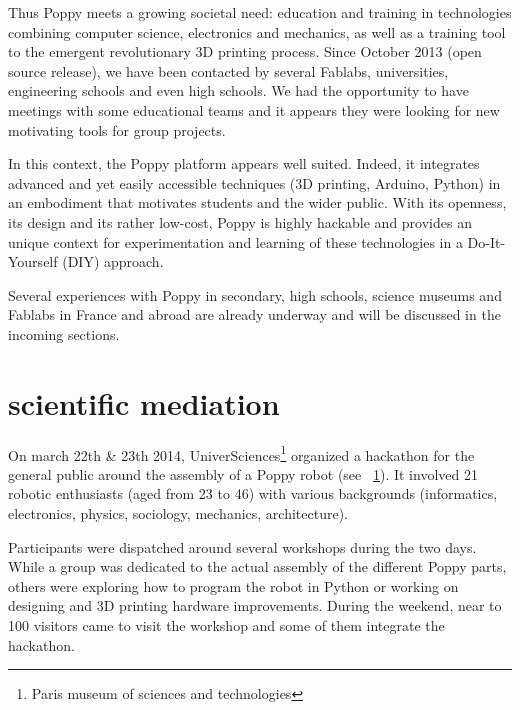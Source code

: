 Thus Poppy meets a growing societal need: education and training in technologies combining computer science, electronics and mechanics, as well as a training tool to the emergent revolutionary 3D printing process. Since October 2013 (open source release), we have been contacted by several Fablabs, universities, engineering schools and even high schools. We had the opportunity to have meetings with some educational teams and it appears they were looking for new motivating tools for group projects.

In this context, the Poppy platform appears well suited. Indeed, it integrates advanced and yet easily accessible techniques (3D printing, Arduino, Python) in an embodiment that motivates students and the wider public. With its openness, its design and its rather low-cost, Poppy is highly hackable and provides an unique context for experimentation and learning of these technologies in a Do-It-Yourself (DIY) approach.

Several experiences with Poppy in secondary, high schools, science museums and Fablabs in France and abroad are already underway and will be discussed in the incoming sections.


\section{scientific mediation} %
\label{sec:poppy_universience}

On march 22th \& 23th 2014, UniverSciences\footnote{Paris museum of sciences and technologies} organized a hackathon for the general public around the assembly of a Poppy robot (see \figurename~\ref{fig:universience_hackathon_orga}). It involved 21 robotic enthusiasts (aged from 23 to 46) with various backgrounds (informatics, electronics, physics, sociology, mechanics, architecture).

\begin{figure}[t]
\centering
    \hfil
    \caption{}
    \label{fig:universience_hackathon_orga}
\end{figure}

Participants were dispatched around several workshops during the two days. While a group was dedicated to the actual assembly of the different Poppy parts, others were exploring how to program the robot in Python or working on designing and 3D printing hardware improvements.
During the weekend, near to 100 visitors came to visit the workshop and some of them integrate the hackathon.

